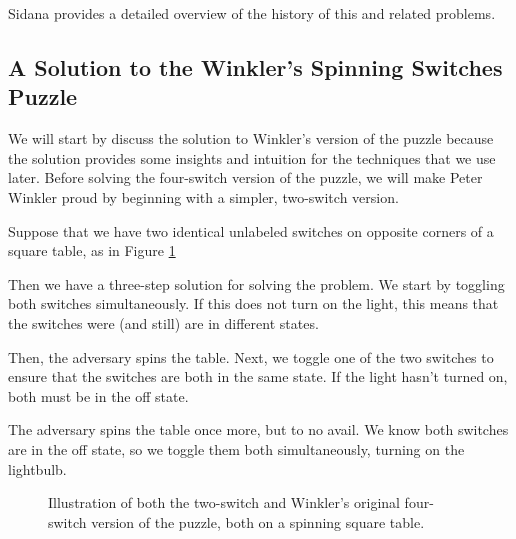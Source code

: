 Sidana \cite{Sidana2020} provides a detailed overview of the history of this
and related problems.

\subsection{A Solution to the Winkler's Spinning Switches Puzzle}

We will start by discuss the solution to Winkler's version of the puzzle because
the solution provides some insights and intuition for the techniques that we use
later. Before solving the four-switch version of the puzzle,
we will make Peter Winkler proud by beginning with a simpler, two-switch version.

\begin{example}
  Suppose that we have two identical unlabeled switches on opposite corners
  of a square table, as in Figure \ref{fig:twoSwitches}

  Then we have a three-step solution for solving the problem. We start by
  toggling both switches simultaneously. If this does not turn on the light,
  this means that the switches were (and still) are in different states.

  Then, the adversary spins the table. Next, we toggle one of the two switches
  to ensure that the switches are both in the same state. If the light hasn't
  turned on, both must be in the off state.

  The adversary spins the table once more, but to no avail. We know both
  switches are in the off state, so we toggle them both simultaneously, turning
  on the lightbulb.
\end{example}

\begin{figure}
  \center
  \caption{
    Illustration of both the two-switch and Winkler's original four-switch
    version of the puzzle, both on a spinning square table.
  }
  \label{fig:twoSwitches}
\end{figure}

